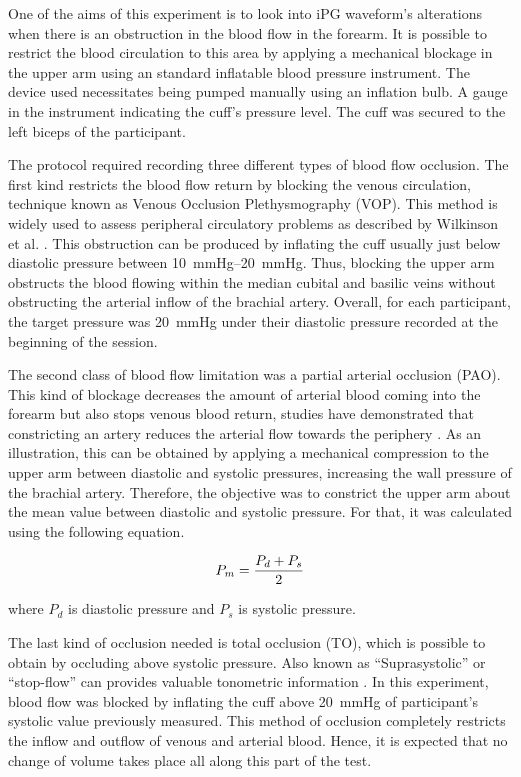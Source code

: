 One of the aims of this experiment is to look into iPG waveform's alterations when there is an obstruction in the blood flow in the forearm. It is possible to restrict the blood circulation to this area by applying a mechanical blockage in the upper arm using an standard inflatable blood pressure instrument. The device used necessitates being pumped manually using an inflation bulb. A gauge in the instrument indicating the cuff's pressure level. The cuff was secured to the left biceps of the participant. 

The protocol required recording three different types of blood flow occlusion. The first kind restricts the blood flow return by blocking the venous circulation, technique known as Venous Occlusion Plethysmography (VOP). This method is widely used to assess peripheral circulatory problems as described by Wilkinson et al. \cite{wilkinson2001venous}. This obstruction can be produced by inflating the cuff usually just below diastolic pressure between \SIrange{10}{20}{\mmHg}. Thus, blocking the upper arm obstructs the blood flowing within the median cubital and basilic veins without obstructing the arterial inflow of the brachial artery.  Overall, for each participant, the target pressure was \SI{20}{\mmHg} under their diastolic pressure recorded at the beginning of the session.

The second class of blood flow limitation was a partial arterial occlusion (PAO). This kind of blockage decreases the amount of arterial blood coming into the forearm but also stops venous blood return, studies have demonstrated that constricting an artery reduces the arterial flow towards the periphery \cite{uchida1977cyclical}. As an illustration, this can be obtained by applying a mechanical compression to the upper arm between diastolic and systolic pressures, increasing the wall pressure of the brachial artery. Therefore, the objective was to constrict the upper arm about the mean value between diastolic and systolic pressure. For that, it was calculated using the following equation.

\begin{align}
	\label{eq:meanpressure}
	P_m = \frac{P_d + P_s}{2} \tagaddtext{[\si{\mmHg}]}
\end{align}

where $P_d$ is diastolic pressure and $P_s$ is systolic pressure. 

The last kind of occlusion needed is total occlusion (TO), which is possible to obtain by occluding above systolic pressure. Also known as  “Suprasystolic” or “stop-flow” can provides valuable tonometric information \cite{lowe2009non}. In this experiment, blood flow was blocked by inflating the cuff above \SI{20}{\mmHg} of participant's systolic value previously measured. This method of occlusion completely restricts the inflow and outflow of venous and arterial blood. Hence, it is expected that no change of volume takes place all along this part of the test.

